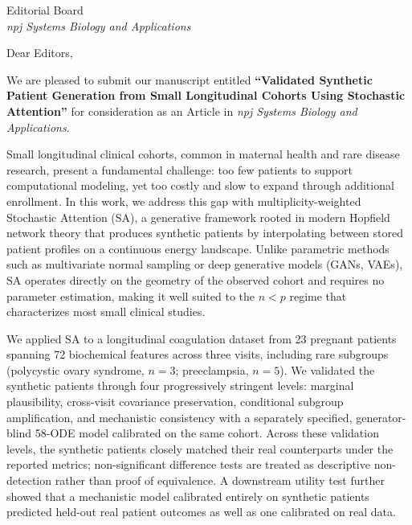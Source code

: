 \documentclass[11pt]{letter}
\date{\today}
\begin{document}
\begin{letter}{Editorial Board\\
\textit{npj Systems Biology and Applications}}

\opening{Dear Editors,}

We are pleased to submit our manuscript entitled
\textbf{``Validated Synthetic Patient Generation from Small Longitudinal
Cohorts Using Stochastic Attention''}
for consideration as an Article in \textit{npj Systems Biology and Applications}.

Small longitudinal clinical cohorts, common in maternal health and rare disease
research, present a fundamental challenge: too few patients to support
computational modeling, yet too costly and slow to expand through additional
enrollment. In this work, we address this gap with multiplicity-weighted
Stochastic Attention (SA), a generative framework rooted in modern Hopfield
network theory that produces synthetic patients by interpolating between
stored patient profiles on a continuous energy landscape. Unlike parametric
methods such as multivariate normal sampling or deep generative models (GANs,
VAEs), SA operates directly on the geometry of the observed cohort and requires
no parameter estimation, making it well suited to the $n < p$ regime that
characterizes most small clinical studies.

We applied SA to a longitudinal coagulation dataset from 23 pregnant patients
spanning 72 biochemical features across three visits, including rare subgroups
(polycystic ovary syndrome, $n{=}3$; preeclampsia, $n{=}5$). We validated the
synthetic patients through four progressively stringent levels: marginal
plausibility, cross-visit covariance preservation, conditional subgroup
amplification, and mechanistic consistency with a separately specified,
generator-blind 58-ODE model calibrated on the same cohort. Across these
validation levels, the synthetic patients closely matched their real counterparts
under the reported metrics; non-significant difference tests are treated as
descriptive non-detection rather than proof of equivalence. A downstream utility
test further showed that a mechanistic model calibrated entirely on synthetic
patients predicted held-out real patient outcomes as well as one calibrated on
real data.


\end{letter}
\end{document}
